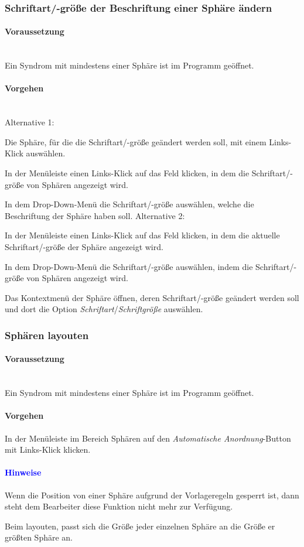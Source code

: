 \documentclass[enabledeprecatedfontcommands,fontsize=11pt,paper=a4,twoside]{scrartcl}
\newcounter{one}
\newcounter{two}[one]
\newcommand*{\hint}{\paragraph{\textcolor{blue}{Hinweise}}}
\newcommand*{\condition}{\paragraph{Voraussetzung}$\;$ \vspace{0.2cm}\\}
\newcommand*{\actions}{\paragraph{Vorgehen} $\;$\vspace{0.2cm}\\}
\newcommand*{\action}{\paragraph{Vorgehen}}
\newcommand*{\aOne}{\textcolor{bbe}{Alternative 1:}}
\newcommand*{\aTwo}{\textcolor{bbe}{Alternative 2:}}
\let\tempone\itemize
\let\temptwo\enditemize
\renewenvironment{itemize}{\tempone\addtolength{\itemsep}{-10.0pt}}{\temptwo}
\let\origenumerate\enumerate
\let\origendenumerate\endenumerate
\renewenvironment{enumerate}{\origenumerate \addtolength{\itemsep}{-10.0pt}}{\origendenumerate}
\begin{document}
\subsubsection{Schriftart/-größe der Beschriftung einer Sphäre ändern}
		\condition 	
		Ein Syndrom mit mindestens einer Sphäre ist im Programm geöffnet. 
		\actions  
		\aOne
		\begin{enumerate}
			\item Die Sphäre, für die die Schriftart/-größe geändert werden soll, mit einem Links-Klick auswählen.
			\item In der Menüleiste einen Links-Klick auf das Feld klicken, in dem die Schriftart/-größe von Sphären angezeigt wird.
			\item In dem Drop-Down-Menü die Schriftart/-größe auswählen, welche die Beschriftung der Sphäre haben soll.
		\end{enumerate}
		\aTwo
		\begin{enumerate}
			\item In der Menüleiste einen Links-Klick auf das Feld klicken, in dem die aktuelle Schriftart/-größe der Sphäre angezeigt wird.
			\item In dem Drop-Down-Menü die Schriftart/-größe auswählen, indem die Schriftart/-größe von Sphären angezeigt wird.
			\item Das Kontextmenü der Sphäre öffnen, deren Schriftart/-größe geändert werden soll und dort die Option \textit{Schriftart}/\textit{Schriftgröße} auswählen. \\
		\end{enumerate}
			
		\subsubsection{Sphären layouten}
		\condition 	
		Ein Syndrom mit mindestens einer Sphäre ist im Programm geöffnet. 
		\action  
		\begin{enumerate}
			\item In der Menüleiste im Bereich Sphären auf den \textit{Automatische Anordnung}-Button mit Links-Klick klicken.
		\end{enumerate}
		\hint
		\begin{itemize}
			\item Wenn die Position von einer Sphäre aufgrund der Vorlageregeln gesperrt ist, dann steht dem Bearbeiter diese Funktion nicht mehr zur Verfügung. 
			\item Beim layouten, passt sich die Größe jeder einzelnen Sphäre an die Größe er größten Sphäre an.\\
		\end{itemize}		
			
\end{document}
